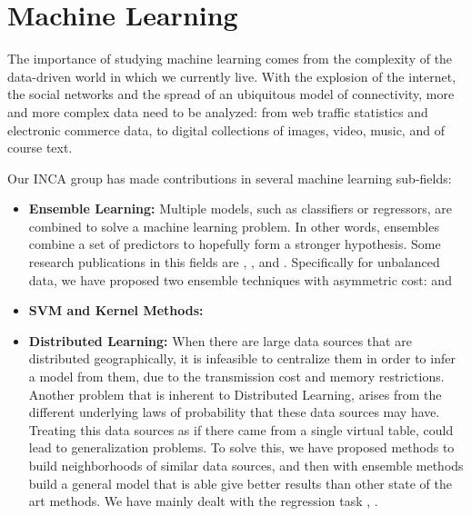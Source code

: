 \section{Machine Learning}

The importance of studying machine learning comes from the complexity of the
data-driven world in which we currently live. With the explosion of the
internet, the social networks and the spread of an ubiquitous model of
connectivity, more and more complex data need to be analyzed: from web traffic
statistics and electronic commerce data, to digital collections of images,
video, music, and of course text.

Our INCA group has made contributions in several machine learning sub-fields:
\begin{itemize}
\item \textbf{Ensemble Learning:} Multiple models, such as classifiers or regressors, are combined to solve a machine learning problem. In other words, ensembles combine a set of predictors to hopefully form a stronger hypothesis. Some research publications in this fields are \cite{NanculefVAM06}, \cite{ValleSAMF10}, \cite{FernandezVSA12} and \cite{NanculefVAM12}. Specifically for unbalanced data, we have proposed two ensemble techniques with asymmetric cost: \cite{NanculefVAM07} and \cite{OrmenoRVAA12}
\item \textbf{SVM and Kernel Methods:}
\item \textbf{Distributed Learning:}
When there are large data sources that are distributed geographically, it is
infeasible to centralize them in order to infer a model from them, due to the
transmission cost and memory restrictions. Another problem that is inherent to
Distributed Learning, arises from the different underlying laws of probability
that these data sources may have. Treating this data sources as if there came
from a single virtual table, could lead to generalization problems. To solve
this, we have proposed methods to build neighborhoods of similar data sources,
and then with ensemble methods build a general model that is able give better
results than other state of the art methods. We have mainly dealt with the
regression task \cite{Allende13}, \cite{Allende14}. 

\end{itemize}
